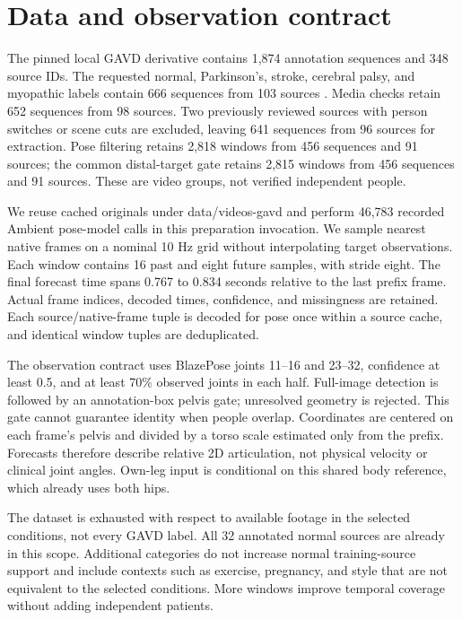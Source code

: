 \documentclass[letterpaper]{article}
\begin{document}
\section{Data and observation contract}

The pinned local GAVD derivative contains 1,874 annotation sequences and 348 source IDs. The requested normal, Parkinson's, stroke, cerebral palsy, and myopathic labels contain 666 sequences from 103 sources \citep{ranjan2025}. Media checks retain 652 sequences from 98 sources. Two previously reviewed sources with person switches or scene cuts are excluded, leaving 641 sequences from 96 sources for extraction. Pose filtering retains 2,818 windows from 456 sequences and 91 sources; the common distal-target gate retains 2,815 windows from 456 sequences and 91 sources. These are video groups, not verified independent people.

We reuse cached originals under data/videos-gavd and perform 46,783 recorded Ambient pose-model calls in this preparation invocation. We sample nearest native frames on a nominal 10 Hz grid without interpolating target observations. Each window contains 16 past and eight future samples, with stride eight. The final forecast time spans 0.767 to 0.834 seconds relative to the last prefix frame. Actual frame indices, decoded times, confidence, and missingness are retained. Each source/native-frame tuple is decoded for pose once within a source cache, and identical window tuples are deduplicated.

The observation contract uses BlazePose joints 11--16 and 23--32, confidence at least 0.5, and at least 70\% observed joints in each half. Full-image detection is followed by an annotation-box pelvis gate; unresolved geometry is rejected. This gate cannot guarantee identity when people overlap. Coordinates are centered on each frame's pelvis and divided by a torso scale estimated only from the prefix. Forecasts therefore describe relative 2D articulation, not physical velocity or clinical joint angles. Own-leg input is conditional on this shared body reference, which already uses both hips.

The dataset is exhausted with respect to available footage in the selected conditions, not every GAVD label. All 32 annotated normal sources are already in this scope. Additional categories do not increase normal training-source support and include contexts such as exercise, pregnancy, and style that are not equivalent to the selected conditions. More windows improve temporal coverage without adding independent patients.
\end{document}
